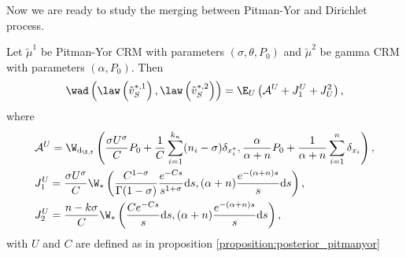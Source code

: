 Now we are ready to study the merging between Pitman-Yor and Dirichlet process. 
\begin{proposition}\label{proposition:distance_pitmanyor_gamma}
    Let $\tilde{\mu}^1$ be Pitman-Yor CRM with parameters $(\sigma, \theta,  P_0)$ and $\tilde{\mu}^2$  be gamma CRM with parameters $(\alpha, P_0)$. Then
    \[
    \wad\left( \law\left(\tilde{v}^{*,1}_{S}\right),  \law\left(\tilde{v}^{*,2}_{S}\right) \right)  = \E_U\left(\mathcal{A}^U + J^U_1 + J^2_U \right),
    \]
    where
    \begin{align*}
        & \mathcal{A}^U = \W_{\mathrm{d}_{\X,t}} \left( \frac{ \sigma U^\sigma}{C}P_0 + \frac{1}{C}\sum_{i = 1}^{k_n}(n_i - \sigma)\delta_{x_i^*}, \frac{\alpha}{\alpha + n}P_0 + \frac{1}{\alpha + n}\sum_{i = 1}^n \delta_{x_i}\right), \\
        & J_1^U = \frac{ \sigma U^\sigma}{C}\W_*\left( \frac{C^{1-\sigma}}{\Gamma(1-\sigma)}\frac{e^{-Cs}}{s^{1+\sigma}}\mathrm{d}s, (\alpha+n)\frac{e^{-(\alpha+n)s}}{s}\mathrm{d}s\right), \\
        & J_2^U = \frac{n - k\sigma}{C}\W_*\left( \frac{Ce^{-Cs}}{s}\mathrm{d}s, (\alpha + n)\frac{e^{-(\alpha+n)s}}{s}\mathrm{d}s\right),
    \end{align*}
    with $U $ and $C $ are defined as in proposition \ref{proposition:posterior_pitmanyor}
\end{proposition}

